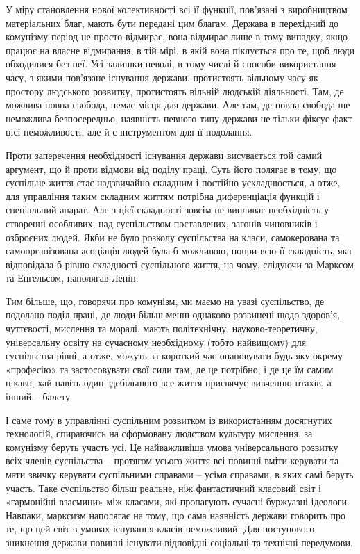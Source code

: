 \documentclass[../main]{subfiles}
\begin{document}
У міру становлення нової колективності всі її функції, пов’язані з виробництвом матеріальних благ, мають бути передані цим благам. Держава в перехідний до комунізму період не просто відмирає, вона відмирає лише в тому випадку, якщо працює на власне відмирання, в тій мірі, в якій вона піклується про те, щоб люди обходилися без неї. Усі залишки неволі, в тому числі й способи використання часу, з якими пов’язане існування держави, протистоять вільному часу як простору людського розвитку, протистоять вільній людській діяльності. Там, де можлива повна свобода, немає місця для держави. Але там, де повна свобода ще неможлива безпосередньо, наявність певного типу держави не тільки фіксує факт цієї неможливості, але й є інструментом для її подолання.

Проти заперечення необхідності існування держави висувається той самий аргумент, що й проти відмови від поділу праці. Суть його полягає в тому, що суспільне життя стає надзвичайно складним і постійно ускладнюється, а отже, для управління таким складним життям потрібна диференціація функцій і спеціальний апарат. Але з цієї складності зовсім не випливає необхідність у створенні особливих, над суспільством поставлених, загонів чиновників і озброєних людей. Якби не було розколу суспільства на класи, самокерована та самоорганізована асоціація людей була б можливою, попри всю її складність, яка відповідала б рівню складності суспільного життя, на чому, слідуючи за Марксом та Енгельсом, наполягав Ленін.

Тим більше, що, говорячи про комунізм, ми маємо на увазі суспільство, де подолано поділ праці, де люди більш-менш однаково розвинені щодо здоров’я, чуттєвості, мислення та моралі, мають політехнічну, науково-теоретичну, універсальну освіту на сучасному необхідному (тобто найвищому) для суспільства рівні, а отже, можуть за короткий час опановувати будь-яку окрему «професію» та застосовувати свої сили там, де це потрібно, і де це їм самим цікаво, хай навіть один здебільшого все життя присвячує вивченню птахів, а інший – балету.

І саме тому в управлінні суспільним розвитком із використанням досягнутих технологій, спираючись на сформовану людством культуру мислення, за комунізму беруть участь усі. Це найважливіша умова універсального розвитку всіх членів суспільства – протягом усього життя всі повинні вміти керувати та мати звичку керувати суспільними справами – усіма справами, в яких самі беруть участь. Таке суспільство більш реальне, ніж фантастичний класовий світ і «гармонійні взаємини» між класами, які пропагують сучасні буржуазні ідеологи. Навпаки, марксизм наполягає на тому, що сама наявність держави говорить про те, що цей світ в умовах існування класів неможливий. Для поступового зникнення держави повинні існувати відповідні соціальні та технічні передумови.
\end{document}
